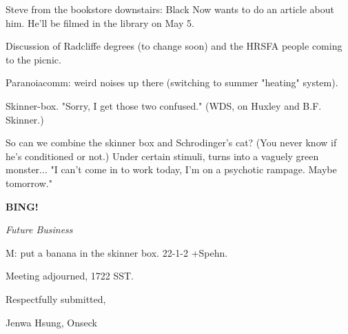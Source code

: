 \documentclass[12pt]{article}
\newcommand{\bing}{{\bf BING!} }
\newcommand{\goto}[1]{\bing \vskip 12pt \centerline{{\em{#1}}}}
\begin{document}
Steve from the bookstore downstairs: Black Now wants to do an article about him. He'll be filmed in the library on May 5.

Discussion of Radcliffe degrees (to change soon) and the HRSFA people coming to the picnic.

Paranoiacomm: weird noises up there (switching to summer "heating" system).

Skinner-box. "Sorry, I get those two confused." (WDS, on Huxley and B.F. Skinner.)

So can we combine the skinner box and Schrodinger's cat? (You never know if he's conditioned or not.) Under certain stimuli, turns into a vaguely green monster... "I can't come in to work today, I'm on a psychotic rampage. Maybe tomorrow."

\goto{Future Business}

M: put a banana in the skinner box. 22-1-2 +Spehn.

\vspace{12pt}

\noindent
Meeting adjourned, 1722 SST.

\vspace{18pt}

\centerline{Respectfully submitted,}
\centerline{Jenwa Hsung, Onseck}
\end{document}
